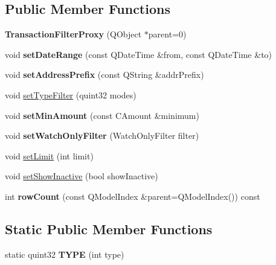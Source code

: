 \subsection*{Public Member Functions}
\begin{DoxyCompactItemize}
\item 
\mbox{\label{class_transaction_filter_proxy_a9981e03a2b60931e3e5adbe7e3fb6b7d}} 
{\bfseries Transaction\+Filter\+Proxy} (Q\+Object $\ast$parent=0)
\item 
\mbox{\label{class_transaction_filter_proxy_ad57cc552db9ce70bb4e8e1c12909992d}} 
void {\bfseries set\+Date\+Range} (const Q\+Date\+Time \&from, const Q\+Date\+Time \&to)
\item 
\mbox{\label{class_transaction_filter_proxy_ad0b4258695ed1fbbf70d29f4e264361a}} 
void {\bfseries set\+Address\+Prefix} (const Q\+String \&addr\+Prefix)
\item 
void \mbox{\hyperlink{class_transaction_filter_proxy_af28eee58aee7585b71f057d044408106}{set\+Type\+Filter}} (quint32 modes)
\item 
\mbox{\label{class_transaction_filter_proxy_a14688071f18551bf7d78225feb8ca8df}} 
void {\bfseries set\+Min\+Amount} (const C\+Amount \&minimum)
\item 
\mbox{\label{class_transaction_filter_proxy_a63123114a91591249492278ba7223834}} 
void {\bfseries set\+Watch\+Only\+Filter} (Watch\+Only\+Filter filter)
\item 
void \mbox{\hyperlink{class_transaction_filter_proxy_a3ec04a38573eb59b8f246f54658d2702}{set\+Limit}} (int limit)
\item 
void \mbox{\hyperlink{class_transaction_filter_proxy_aad1598cc4308eb08d8f617f08f62ece6}{set\+Show\+Inactive}} (bool show\+Inactive)
\item 
\mbox{\label{class_transaction_filter_proxy_a8bd1fab8f6b4bf5f23b8c3ac0d682552}} 
int {\bfseries row\+Count} (const Q\+Model\+Index \&parent=Q\+Model\+Index()) const
\end{DoxyCompactItemize}
\subsection*{Static Public Member Functions}
\begin{DoxyCompactItemize}
\item 
\mbox{\label{class_transaction_filter_proxy_aaacec79a6362b13ee4cfab7f770e33b5}} 
static quint32 {\bfseries T\+Y\+PE} (int type)
\end{DoxyCompactItemize}
